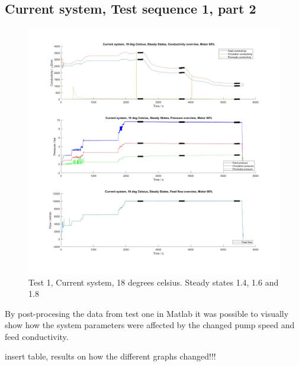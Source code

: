 \newpage

\subsection{Current system, Test sequence 1, part 2}
  
\begin{figure}[H]
    \centering
    \includegraphics[width=1.1\textwidth]{overview20_80}
    \caption{Test 1, Current system, 18 degrees celsius. Steady states 1.4, 1.6 and 1.8}
    \label{fig:PressConn}
\end{figure}

\newpage

By post-procesing the data from test one in Matlab it was possible to visually show how the system parameters were affected by the changed pump speed and feed conductivity. 


insert table, results on how the different graphs changed!!!

